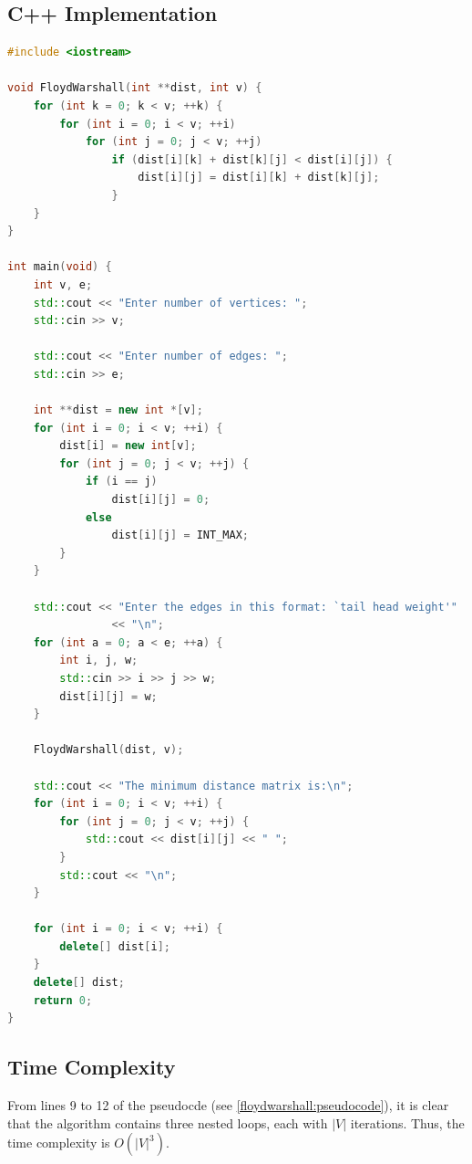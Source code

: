 \documentclass[12pt, a4paper]{article}
\theoremstyle{definition}
\theoremstyle{remark}
\begin{document}
\subsection{C++ Implementation}
\begin{lstlisting}[language=C++]
#include <iostream>

void FloydWarshall(int **dist, int v) {
    for (int k = 0; k < v; ++k) {
        for (int i = 0; i < v; ++i)
            for (int j = 0; j < v; ++j)
                if (dist[i][k] + dist[k][j] < dist[i][j]) {
                    dist[i][j] = dist[i][k] + dist[k][j];
                }
    }
}

int main(void) {
    int v, e;
    std::cout << "Enter number of vertices: ";
    std::cin >> v;

    std::cout << "Enter number of edges: ";
    std::cin >> e;

    int **dist = new int *[v];
    for (int i = 0; i < v; ++i) {
        dist[i] = new int[v];
        for (int j = 0; j < v; ++j) {
            if (i == j)
                dist[i][j] = 0;
            else
                dist[i][j] = INT_MAX;
        }
    }

    std::cout << "Enter the edges in this format: `tail head weight'"
                << "\n";
    for (int a = 0; a < e; ++a) {
        int i, j, w;
        std::cin >> i >> j >> w;
        dist[i][j] = w;
    }

    FloydWarshall(dist, v);

    std::cout << "The minimum distance matrix is:\n";
    for (int i = 0; i < v; ++i) {
        for (int j = 0; j < v; ++j) {
            std::cout << dist[i][j] << " ";
        }
        std::cout << "\n";
    }

    for (int i = 0; i < v; ++i) {
        delete[] dist[i];
    }
    delete[] dist;
    return 0;
}
\end{lstlisting}

\subsection{Time Complexity}
From lines 9 to 12 of the pseudocde (see \cref{floydwarshall:pseudocode}), it is clear that the algorithm contains three nested loops, each with $|V|$ iterations. Thus, the time complexity is $O(|V|^3)$.
\end{document}
